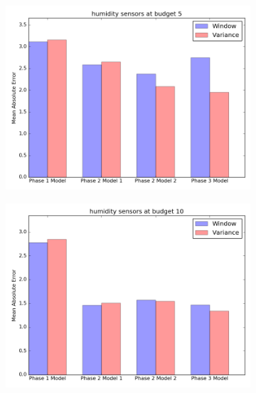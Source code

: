 \documentclass{article}
\begin{document}
\begin{figure}[h!]
	\begin{subfigure}{\linewidth}
	\includegraphics[scale=0.5]{humidity_5_final.png}
	\end{subfigure}
	\begin{subfigure}{\linewidth}
	\includegraphics[scale=0.5]{humidity_10_final.png}
	\end{subfigure}
\end{figure}

\newpage
\end{document}
